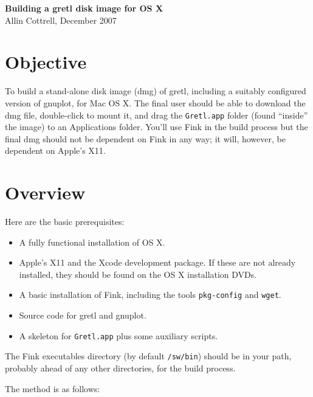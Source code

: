 \documentclass{article}
\begin{document}
\setlength{\parskip}{1ex}
\setlength{\parindent}{0pt}

\begin{center}
  {\Large \textbf{Building a gretl disk image for OS X}}\\[6pt]
Allin Cottrell, December 2007
\end{center}

\section{Objective}

To build a stand-alone disk image (dmg) of gretl, including a suitably
configured version of gnuplot, for Mac OS X.  The final user should be
able to download the dmg file, double-click to mount it, and drag the
\texttt{Gretl.app} folder (found ``inside'' the image) to an
Applications folder.  You'll use Fink in the build process but the
final dmg should not be dependent on Fink in any way; it will,
however, be dependent on Apple's X11.

\section{Overview}

Here are the basic prerequisites:

\begin{itemize}
\item A fully functional installation of OS X.
\item Apple's X11 and the Xcode development package.  If these are
  not already installed, they should be found on the OS X installation
  DVDs.
\item A basic installation of Fink, including the tools
  \texttt{pkg-config} and \texttt{wget}.
\item Source code for gretl and gnuplot.
\item A skeleton for \texttt{Gretl.app} plus some auxiliary scripts.
\end{itemize}

The Fink executables directory (by default \texttt{/sw/bin}) should be
in your path, probably ahead of any other directories, for the build
process.

The method is as follows:
\end{document}
